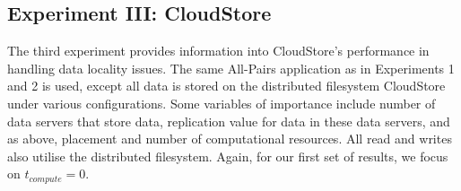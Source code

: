 \documentclass{rspublic}
\begin{document}
\subsection{Experiment III: CloudStore} 
The third experiment provides information into CloudStore's performance
in handling data locality issues. The same All-Pairs application as in
Experiments 1 and 2 is used, except all data is stored on the
distributed filesystem CloudStore under various configurations. Some
variables of importance include number of data servers that store data,
replication value for data in these data servers, and as above,
placement and number of computational resources.  All read and writes
also utilise the distributed filesystem. Again, for our first set of
results, we focus on $t_{compute}=0$.  
\begin{figure}
\begin{center}
\end{center}
\end{figure}
\end{document}

